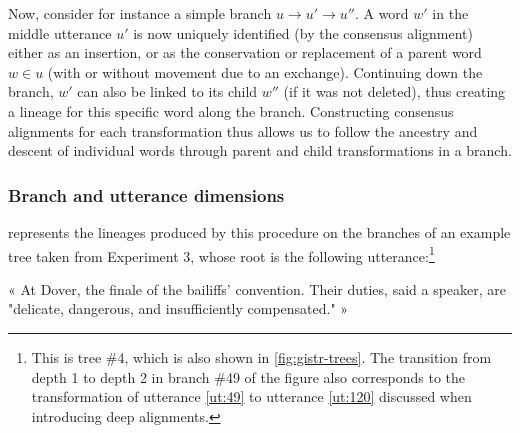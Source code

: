 Now, consider for instance a simple branch
\(u \rightarrow u' \rightarrow u''\). A word \(w'\) in the middle
utterance \(u'\) is now uniquely identified (by the consensus alignment)
either as an insertion, or as the conservation or replacement of a
parent word \(w \in u\) (with or without movement due to an exchange).
Continuing down the branch, \(w'\) can also be linked to its child
\(w''\) (if it was not deleted), thus creating a lineage for this
specific word along the branch. Constructing consensus alignments for
each transformation thus allows us to follow the ancestry and descent of
individual words through parent and child transformations in a branch.

\subsubsection{Branch and utterance
dimensions}\label{branch-and-utterance-dimensions}

 represents the lineages produced by this
procedure on the branches of an example tree taken from Experiment 3,
whose root is the following utterance:\footnote{This is tree \#4, which
  is also shown in \cref{fig:gistr-trees}. The transition from depth 1
  to depth 2 in branch \#49 of the figure also corresponds to the
  transformation of utterance \ref{ut:49} to utterance \ref{ut:120}
  discussed when introducing deep alignments.}

\begin{nquote} %
  « At Dover, the finale of the bailiffs' convention. Their duties, said a speaker, are "delicate, dangerous, and insufficiently compensated." »
\end{nquote}

